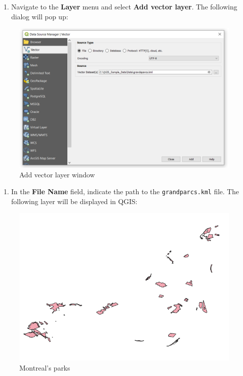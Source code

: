 \documentclass[]{book}
\providecommand{\tightlist}{%
  \setlength{\itemsep}{0pt}\setlength{\parskip}{0pt}}
\theoremstyle{definition}
\theoremstyle{definition}
\theoremstyle{definition}
\theoremstyle{remark}
\begin{document}
\begin{enumerate}
\def\labelenumi{\arabic{enumi}.}
\tightlist
\item
  Navigate to the \textbf{Layer} menu and select \textbf{Add vector
  layer}. The following dialog will pop up:
\end{enumerate}

\begin{figure}

{\centering \includegraphics[width=14.32in]{figures/Import_KML} 

}

\caption{Add vector layer window}\label{fig:unnamed-chunk-5}
\end{figure}

\begin{enumerate}
\def\labelenumi{\arabic{enumi}.}
\setcounter{enumi}{1}
\tightlist
\item
  In the \textbf{File Name} field, indicate the path to the
  \texttt{grandparcs.kml} file. The following layer will be displayed in
  QGIS:
\end{enumerate}

\begin{figure}

{\centering \includegraphics[width=9.64in]{figures/Import_KML_2} 

}

\caption{Montreal's parks}\label{fig:unnamed-chunk-6}
\end{figure}
\end{document}
